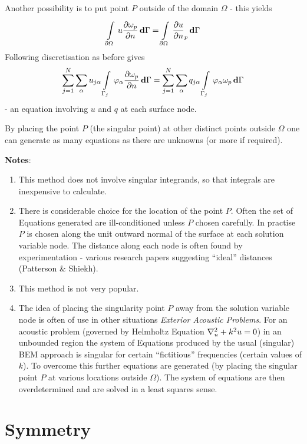 Another possibility is to put point $P$ outside of the domain $\Omega$ - this
yields
\begin{equation*}
    \displaystyle\int\limits_{\partial\Omega}^{} \,u  \dfrac{\partial \omega_{p}}{\partial n} \, \boldsymbol{\mathrm{d}} \Gamma  = 
    \displaystyle\int\limits_{\partial\Omega}^{} \, \dfrac{\partial u}{\partial n} _{p}\, \boldsymbol{\mathrm{d}} \Gamma 
\end{equation*}
Following discretisation as before gives
\begin{equation*}
   \displaystyle\sum_{j=1}^{N}   \displaystyle\sum_{\alpha}^{}  u_{j\alpha}   \displaystyle\int\limits_{\Gamma_{j}}^{} \, \varphi_{\alpha}   \dfrac{\partial \omega_{p}}{\partial n} \, \boldsymbol{\mathrm{d}} \Gamma  =
   \displaystyle\sum_{j=1}^{N}   \displaystyle\sum_{\alpha}^{}  q_{j\alpha}   \displaystyle\int\limits_{\Gamma_{j}}^{} \, \varphi_{\alpha} \omega_{p}\, \boldsymbol{\mathrm{d}} \Gamma 
\end{equation*}   
- an equation involving $u$ and $q$ at each surface node.

By placing the point $P$ (the singular point) at other distinct points outside
$\Omega$ one can generate as many equations as there are unknowns (or more if
required).

\textbf{Notes}:
\begin{enumerate}
\item This method does not involve singular integrands, so that
integrals are inexpensive to calculate.
\item There is considerable choice for the location of the point $P$.  Often
  the set of Equations generated are ill-conditioned unless $P$ chosen
  carefully.  In practise $P$ is chosen along the unit outward normal of the
  surface at each solution variable node. The distance along each node is
  often found by experimentation - various research papers suggesting
  ``ideal'' distances (Patterson \& Shiekh).
\item This method is not very popular.
\item The idea of placing the singularity point $P$ away from the solution
  variable node is often of use in other situations \eg \emph{Exterior
    Acoustic Problems}. For an acoustic problem (governed by Helmholtz Equation
  $\laplacian{u} + k^{2}u=0$) in an unbounded region the system of Equations
  produced by the usual (singular) BEM approach is singular for certain
  ``fictitious'' frequencies (\ie certain values of $k$).  To overcome this
  further equations are generated (by placing the singular point $P$ at
  various locations outside $\Omega$). The system of equations are then
  overdetermined and are solved in a least squares sense.
\end{enumerate}

\section{Symmetry}

